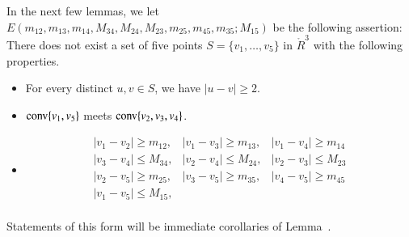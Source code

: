 \begin{tarskidata}
\begin{tarski}
\begin{definition}
In the next few lemmas, we let
$E(m_{12},m_{13},m_{14},M_{34},M_{24},M_{23},m_{25},m_{45},m_{35};M_{15})$ 
be the following assertion:
There does not exist a set of five points $S=\{v_1,\ldots,v_5\}$ in
$\ring{R}^3$ with the following properties.
\begin{itemize}
  \item For every distinct $u,v\in S$, we have $|u-v|\ge 2$.
    \item ${\operatorname{conv}}\{v_1,v_5\}$ meets ${\operatorname{conv}}\{v_2,v_3,v_4\}$.
  \item $$
    \begin{array}{lll}
      |v_1-v_2|\ge m_{12}, &|v_1-v_3|\ge m_{13}, &|v_1-v_4|\ge m_{14}\\
      |v_3-v_4|\le M_{34}, &|v_2-v_4|\le M_{24}, &|v_2-v_3|\le M_{23}\\
      |v_2-v_5|\ge m_{25}, &|v_3-v_5|\ge m_{35}, &|v_4-v_5|\ge m_{45}\\
      |v_1-v_5|\le M_{15},\\
      \end{array}
    $$
\end{itemize}
\end{definition}
Statements of this form will be immediate corollaries of Lemma~.
\end{tarski}



\begin{tarski}


\end{tarski}
\end{tarskidata}
